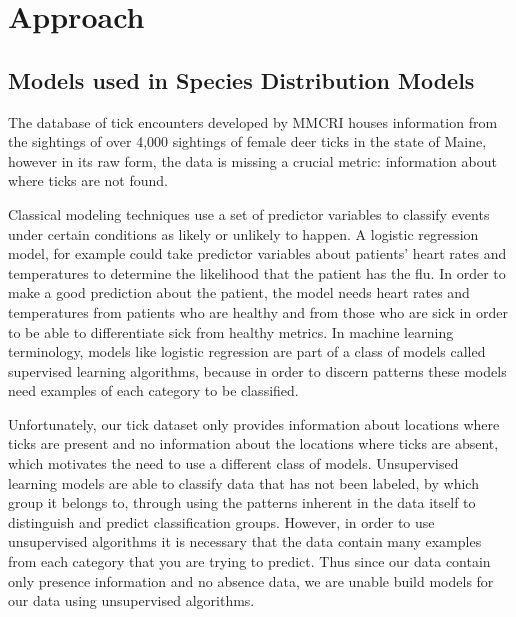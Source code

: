 
\chapter{Approach} %

\label{Chapter2} 



\section{Models used in Species Distribution Models}
\noindent The database of tick encounters developed by MMCRI houses information from the sightings of over 4,000 sightings of female deer ticks in the state of Maine, however in its raw form, the data is missing a crucial metric: information about where ticks are not found. \newline

\noindent Classical modeling techniques use a set of predictor variables to classify events under certain conditions as likely or unlikely to happen. A logistic regression model, for example could take predictor variables about patients' heart rates and temperatures to determine the likelihood that the patient has the flu. In order to make a good prediction about the patient, the model needs heart rates and temperatures from patients who are healthy and from those who are sick in order to be able to differentiate sick from healthy metrics. In machine learning terminology, models like logistic regression are part of a class of models called supervised learning algorithms, because in order to discern patterns these models need examples of each category to be classified. \newline

\noindent Unfortunately, our tick dataset only provides information about locations where ticks are present and no information about the locations where ticks are absent, which motivates the need to use a different class of models. Unsupervised learning models are able to classify data that has not been labeled, by which group it belongs to, through using the patterns inherent in the data itself to distinguish and predict classification groups. However, in order to use unsupervised algorithms it is necessary that the data contain many examples from each category that you are trying to predict. Thus since our data contain only presence information and no absence data, we are unable build models for our data using unsupervised algorithms. \newline

